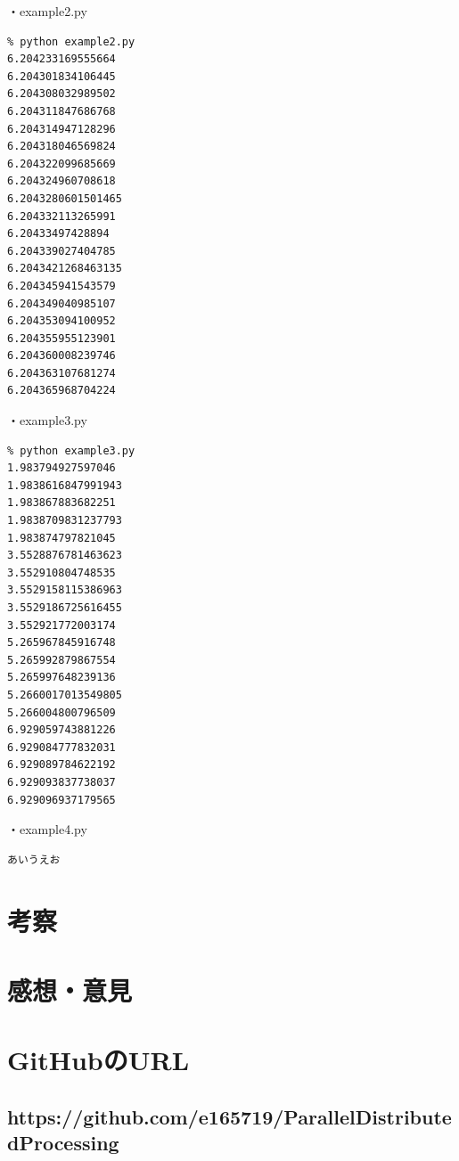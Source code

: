 \documentclass[14pt, oneside]{article}     	%
\begin{document}
・example2.py
\begin{lstlisting}
% python example2.py 
6.204233169555664
6.204301834106445
6.204308032989502
6.204311847686768
6.204314947128296
6.204318046569824
6.204322099685669
6.204324960708618
6.2043280601501465
6.204332113265991
6.20433497428894
6.204339027404785
6.2043421268463135
6.204345941543579
6.204349040985107
6.204353094100952
6.204355955123901
6.204360008239746
6.204363107681274
6.204365968704224
\end{lstlisting}

・example3.py
\begin{lstlisting}
% python example3.py
1.983794927597046
1.9838616847991943
1.983867883682251
1.9838709831237793
1.983874797821045
3.5528876781463623
3.552910804748535
3.5529158115386963
3.5529186725616455
3.552921772003174
5.265967845916748
5.265992879867554
5.265997648239136
5.2660017013549805
5.266004800796509
6.929059743881226
6.929084777832031
6.929089784622192
6.929093837738037
6.929096937179565
\end{lstlisting}

・example4.py
\begin{lstlisting}
あいうえお
\end{lstlisting}

\section{考察}






\section{感想・意見}
\section*{GitHubのURL}

\subsection*{https://github.com/e165719/ParallelDistributedProcessing}
\end{document}
